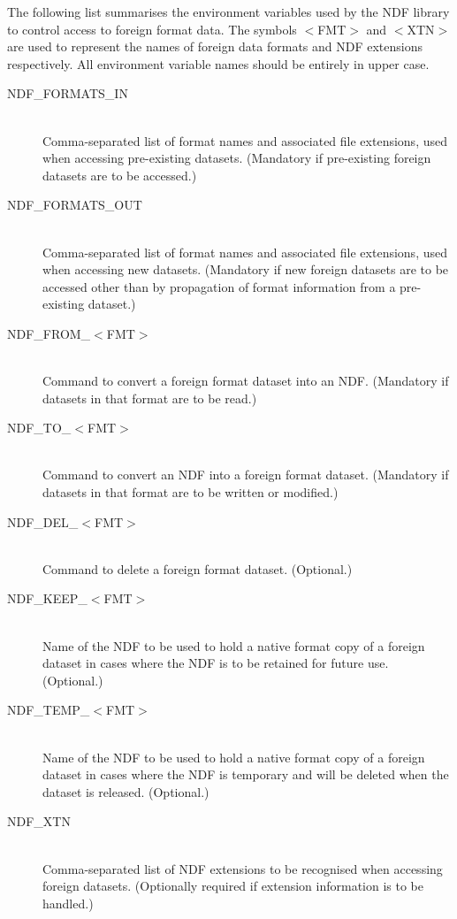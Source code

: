 \documentclass[11pt,twoside,nolof]{starlink}
\begin{document}
The following list summarises the environment variables used by the
NDF library to control access to foreign format data.  The symbols
$<$FMT$>$ and $<$XTN$>$ are used to represent the names of foreign
data formats and NDF extensions respectively.  All environment
variable names should be entirely in upper case.

\begin{description}

\item[NDF\_FORMATS\_IN]\mbox{}\\
Comma-separated list of format names and associated file extensions,
used when accessing pre-existing datasets. (Mandatory if pre-existing
foreign datasets are to be accessed.)

\item[NDF\_FORMATS\_OUT]\mbox{}\\
Comma-separated list of format names and associated file extensions,
used when accessing new datasets. (Mandatory if new foreign datasets
are to be accessed other than by propagation of format information
from a pre-existing dataset.)

\item[NDF\_FROM\_$<$FMT$>$]\mbox{}\\
Command to convert a foreign format dataset into an NDF. (Mandatory if
datasets in that format are to be read.)

\item[NDF\_TO\_$<$FMT$>$]\mbox{}\\
Command to convert an NDF into a foreign format dataset. (Mandatory if
datasets in that format are to be written or modified.)

\item[NDF\_DEL\_$<$FMT$>$]\mbox{}\\
Command to delete a foreign format dataset. (Optional.)

\item[NDF\_KEEP\_$<$FMT$>$]\mbox{}\\
Name of the NDF to be used to hold a native format copy of a foreign
dataset in cases where the NDF is to be retained for future
use. (Optional.)

\item[NDF\_TEMP\_$<$FMT$>$]\mbox{}\\
Name of the NDF to be used to hold a native format copy of a foreign
dataset in cases where the NDF is temporary and will be deleted when
the dataset is released. (Optional.)

\item[NDF\_XTN]\mbox{}\\
Comma-separated list of NDF extensions to be recognised when accessing
foreign datasets. (Optionally required if extension information is to
be handled.)


\end{description}
\end{document}
